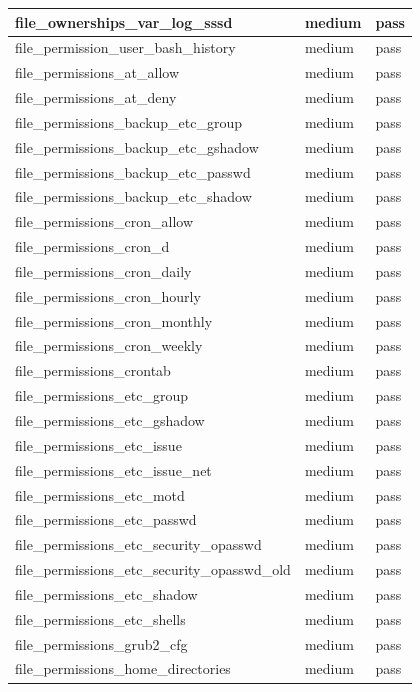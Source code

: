\begin{longtable}{|p{10cm}|p{2cm}|p{2cm}|}
file\_ownerships\_var\_log\_sssd & medium & pass \\
\hline
file\_permission\_user\_bash\_history & medium & pass \\
\hline
file\_permissions\_at\_allow & medium & pass \\
\hline
file\_permissions\_at\_deny & medium & pass \\
\hline
file\_permissions\_backup\_etc\_group & medium & pass \\
\hline
file\_permissions\_backup\_etc\_gshadow & medium & pass \\
\hline
file\_permissions\_backup\_etc\_passwd & medium & pass \\
\hline
file\_permissions\_backup\_etc\_shadow & medium & pass \\
\hline
file\_permissions\_cron\_allow & medium & pass \\
\hline
file\_permissions\_cron\_d & medium & pass \\
\hline
file\_permissions\_cron\_daily & medium & pass \\
\hline
file\_permissions\_cron\_hourly & medium & pass \\
\hline
file\_permissions\_cron\_monthly & medium & pass \\
\hline
file\_permissions\_cron\_weekly & medium & pass \\
\hline
file\_permissions\_crontab & medium & pass \\
\hline
file\_permissions\_etc\_group & medium & pass \\
\hline
file\_permissions\_etc\_gshadow & medium & pass \\
\hline
file\_permissions\_etc\_issue & medium & pass \\
\hline
file\_permissions\_etc\_issue\_net & medium & pass \\
\hline
file\_permissions\_etc\_motd & medium & pass \\
\hline
file\_permissions\_etc\_passwd & medium & pass \\
\hline
file\_permissions\_etc\_security\_opasswd & medium & pass \\
\hline
file\_permissions\_etc\_security\_opasswd\_old & medium & pass \\
\hline
file\_permissions\_etc\_shadow & medium & pass \\
\hline
file\_permissions\_etc\_shells & medium & pass \\
\hline
file\_permissions\_grub2\_cfg & medium & pass \\
\hline
file\_permissions\_home\_directories & medium & pass \\

\end{longtable}
